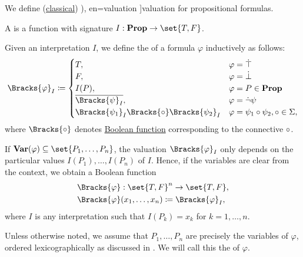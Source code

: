 \begin{definition}\label{def:propositional_valuation}\mimprovised
  We define (\hyperref[rem:classical_logic]{classical}) \term[ru=значение истинности (формулы) (\cite[8]{Эдельман1975}), en=valuation \cite[def. 1.2.1]{VanDalen2004}]{valuation} for propositional formulas.

  \begin{thmenum}
     A  is a function with signature \( I: \boldop{Prop} \to \set{ T, F } \).

     Given an interpretation \( I \), we define the  of a formula \( \varphi \) inductively as follows:
    \begin{equation}\label{eq:def:propositional_valuation/formula_valuation}
      \Bracks{\varphi}_I \coloneqq \begin{cases}
        T,                                                    &\varphi = \syntop \\
        F,                                                    &\varphi = \synbot \\
        I(P),                                                 &\varphi = P \in \boldop{Prop} \\
        \oline{\Bracks{\psi}_I},                              &\varphi = \synneg \psi \\
        \Bracks{\psi_1}_I \Bracks{\bincirc} \Bracks{\psi_2}_I &\varphi = \psi_1 \bincirc \psi_2, \bincirc \in \Sigma,
      \end{cases}
    \end{equation}
    where \( \Bracks{\bincirc} \) denotes \hyperref[def:standard_boolean_functions]{Boolean function} corresponding to the connective \( \bincirc \).

     If \( \boldop{Var}(\varphi) \subseteq \set{ P_1, \ldots, P_n } \), the valuation \( \Bracks{\varphi}_I \) only depends on the particular values \( I(P_1), \ldots, I(P_n) \) of \( I \). Hence, if the variables are clear from the context, we obtain a Boolean function
    \begin{equation*}
      \begin{aligned}
        &\Bracks{\varphi}: \set{ T, F }^n \to \set{ T, F }, \\
        &\Bracks{\varphi}(x_1, \ldots, x_n) \coloneqq \Bracks{\varphi}_I,
      \end{aligned}
    \end{equation*}
    where \( I \) is any interpretation such that \( I(P_k) = x_k \) for \( k = 1, \ldots, n \).

    Unless otherwise noted, we assume that \( P_1, \ldots, P_n \) are precisely the variables of \( \varphi \), ordered lexicographically as discussed in . We will call this the  of \( \varphi \).
  \end{thmenum}
\end{definition}
